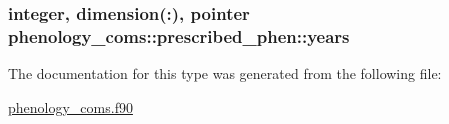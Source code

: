 \subsubsection[{years}]{\setlength{\rightskip}{0pt plus 5cm}integer, dimension(\+:), pointer phenology\+\_\+coms\+::prescribed\+\_\+phen\+::years}\label{structphenology__coms_1_1prescribed__phen_ae40ae2762a61f5e09ce4162444b253b0}


The documentation for this type was generated from the following file\+:\begin{DoxyCompactItemize}
\item 
\hyperlink{phenology__coms_8f90}{phenology\+\_\+coms.\+f90}\end{DoxyCompactItemize}
